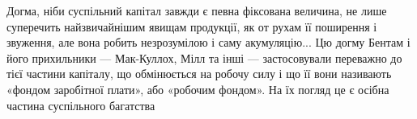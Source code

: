 Догма, ніби суспільний капітал завжди є певна фіксована величина,
не лише суперечить найзвичайнішим явищам продукції, як от рухам її
поширення і звуження, але вона робить незрозумілою і саму акумуляцію...
Цю догму Бентам і його прихильники — Мак-Куллох, Мілл та інші —
застосовували переважно до тієї частини капіталу, що обмінюється на
робочу силу і що її вони називають «фондом заробітної плати», або «робочим
фондом». На їх погляд це є осібна частина суспільного багатства
